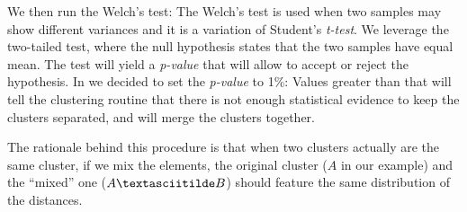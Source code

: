We then run the Welch's test: The Welch's test is used when two samples may
show different variances and it is a variation of Student's \emph{t-test}.
We leverage the two-tailed test, where the null hypothesis states that the two
samples have equal mean. The test will yield a \emph{p-value} that will allow to
accept or reject the hypothesis. In \thesystem we decided to set the \emph{p-value}
to 1\%: Values greater than that will tell the clustering routine
that there is not enough statistical evidence to keep the clusters separated, and
\thesystem will merge the clusters together.

The rationale behind this procedure is that when two clusters actually are the same
cluster, if we mix the elements, the original cluster ($A$ in our example) and the
``mixed'' one ($A \textasciitilde B$) should feature the same distribution of
the distances.

